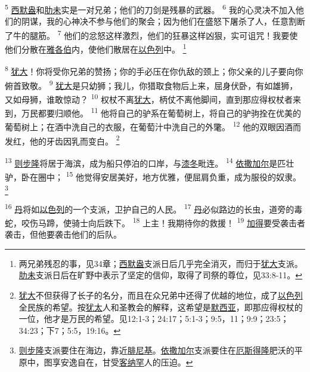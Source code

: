 \textsuperscript{5}
\uline{西默盎}和\uline{肋未}实是一对兄弟；他们的刀剑是残暴的武器。
\textsuperscript{6}
我的心灵决不加入他们的阴谋，我的心神决不参与他们的聚会；因为他们在盛怒下屠杀了人，任意割断了牛的腿筋。
\textsuperscript{7}
他们的忿怒这样激烈，他们的狂暴这样凶狠，实可诅咒！我要使他们分散在\uline{雅各伯}内，使他们散居在\uline{以色列}中。
\footnote{两兄弟残忍的事，见34章；\uline{西默盎}支派日后几乎完全消灭，而归于\uline{犹大}支派。\uline{肋未}支派日后在旷野中表示了坚定的信仰，取得了司祭的尊位，见33:8-11。}

\textsuperscript{8}
\uline{犹大}！你将受你兄弟的赞扬；你的手必压在你仇敌的颈上；你父亲的儿子要向你俯首致敬。
\textsuperscript{9}
\uline{犹大}是只幼狮；我儿，你猎取食物后上来，屈身伏卧，有如雄狮，又如母狮，谁敢惊动？
\textsuperscript{10}
权杖不离\uline{犹大}，柄仗不离他脚间，直到那应得权杖者来到，万民都要归顺他。
\textsuperscript{11}
他将自己的驴系在葡萄树上，将自己的驴驹拴在优美的葡萄树上；在酒中洗自己的衣服，在葡萄汁中洗自己的外氅。
\textsuperscript{12}
他的双眼因酒而发红，他的牙齿因乳而变白。
\footnote{\uline{犹大}不但获得了长子的名分，而且在众兄弟中还得了优越的地位，成了\uline{以色列}全民族的希望。按\uline{犹太}人和圣教会的解释，这希望是\uline{默西亚}，即那应得权杖的一位，他才是万民的希望。见12:1-3；24:17；5:1-3；9:5，11；9:9；23:5；34:23；下7；5:5，19:16。}

\textsuperscript{13}
\uline{则步隆}将居于海滨，成为船只停泊的口岸，与\uline{漆冬}毗连。
\textsuperscript{14}
\uline{依撒加尔}是匹壮驴，卧在圈中；
\textsuperscript{15}
他觉得安居美好，地方优雅，便屈肩负重，成为服役的奴隶。
\footnote{\uline{则步隆}支派要住在海边，靠近\uline{腓尼基}。\uline{依撒加尔}支派要住在\uline{厄斯得隆}肥沃的平原中，图享安逸自在，甘受\uline{客纳罕}人的压迫。}

\textsuperscript{16}
\uline{丹}将如\uline{以色列}的一个支派，卫护自己的人民。
\textsuperscript{17}
\uline{丹}必似路边的长虫，道旁的毒蛇，咬伤马蹄，使骑士向后跌下。
\textsuperscript{18}
上主！我期待你的救援！
\textsuperscript{19}
\uline{加得}要受袭击者袭击，但他要袭击他们的后队。

